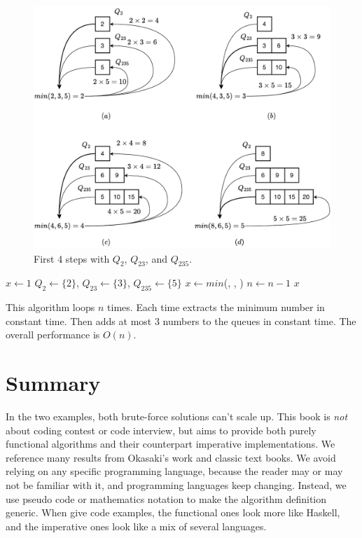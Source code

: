\documentclass[b5paper]{article}
\begin{document}
\begin{figure}[htbp]
  \centering
  \includegraphics[scale=0.5]{img/q235}
  \caption{First 4 steps with $Q_2$, $Q_{23}$, and $Q_{235}$.}
  \label{fig:q235}
\end{figure}

\begin{algorithmic}[1]
  \State $x \gets 1$
  \State $Q_2 \gets \{ 2 \}$, $Q_{23} \gets \{ 3 \}$, $Q_{235} \gets \{ 5 \}$
    \State $x \gets min$(, , )
      \State {}
      \State {}
      \State {}
      \State {}
      \State {}
      \State {}
      \State {}
    \Else
      \State {}
      \State {}
    \EndIf
    \State $n \gets n - 1$
  \EndWhile
  \State \Return $x$
\EndFunction
\end{algorithmic}

This algorithm loops $n$ times. Each time extracts the minimum number in constant time. Then adds at most 3 numbers to the queues in constant time. The overall performance is $O(n)$.

\section*{Summary}
In the two examples, both brute-force solutions can't scale up. This book is {\em not} about coding contest or code interview, but aims to provide both purely functional algorithms and their counterpart imperative implementations. We reference many results from Okasaki's work\cite{okasaki-book} and classic text books\cite{CLRS}. We avoid relying on any specific programming language, because the reader may or may not be familiar with it, and programming languages keep changing. Instead, we use pseudo code or mathematics notation to make the algorithm definition generic. When give code examples, the functional ones look more like Haskell, and the imperative ones look like a mix of several languages.
\end{document}
